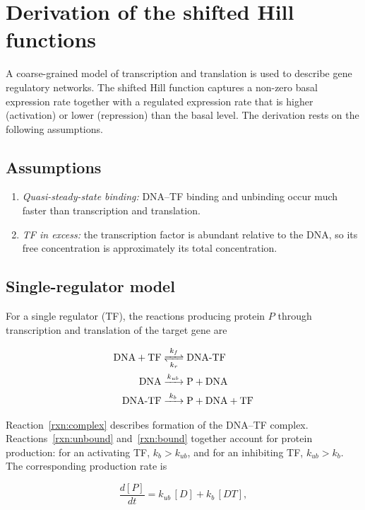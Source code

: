 \section{Derivation of the shifted Hill functions}

A coarse-grained model of transcription and translation is used to describe gene
regulatory networks. The shifted Hill function captures a non-zero basal
expression rate together with a regulated expression rate that is higher
(activation) or lower (repression) than the basal level. The derivation rests on
the following assumptions.

\subsection{Assumptions}

\begin{enumerate}
    \item \emph{Quasi-steady-state binding:} DNA--TF binding and unbinding occur
    much faster than transcription and translation.
    \item \emph{TF in excess:} the transcription factor is abundant relative to
    the DNA, so its free concentration is approximately its total concentration.
\end{enumerate}

\subsection{Single-regulator model}

For a single regulator (TF), the reactions producing protein $P$ through
transcription and translation of the target gene are

\begin{align}
    \ce{DNA + TF &<=>[$k_f$][$k_r$] DNA{-}TF} \label{rxn:complex} \\
    \ce{DNA &->[$k_{ub}$] P + DNA} \label{rxn:unbound} \\
    \ce{DNA{-}TF &->[$k_{b}$] P + DNA + TF} \label{rxn:bound}
\end{align}

Reaction~\eqref{rxn:complex} describes formation of the DNA--TF complex.
Reactions~\eqref{rxn:unbound} and~\eqref{rxn:bound} together account for protein
production: for an activating TF, $k_b > k_{ub}$, and for an inhibiting TF,
$k_{ub} > k_b$. The corresponding production rate is

\begin{equation}
    \frac{d[P]}{dt} = k_{ub}\,[D] + k_{b}\,[DT],
    \label{eq:rate}
\end{equation}

